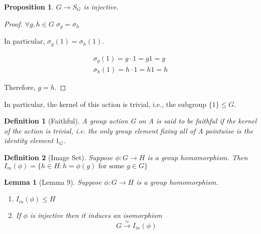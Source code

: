 \documentclass[11pt, oneside]{book}
\theoremstyle{break}
\newtheorem*{proof}{Proof}
\newtheorem{lemma}{Lemma}[section]
\newtheorem{propo}{Proposition}[section]
\newtheorem{defn}{Definition}[section]
\begin{document}
\begin{propo}
    \label{propo_8}
    $G \to S_G$ is injective.
\end{propo}

\begin{proof}
    $\forall g, h \in G \; \sigma_g = \sigma_h$

    In particular, $\sigma_g(1) = \sigma_h(1)$.

    \begin{gather*}
        \sigma_g(1) = g \cdot 1 = g1 = g \\
        \sigma_h(1) = h \cdot 1 = h1 = h
    \end{gather*}

    Therefore, $g = h$.
\end{proof}

In particular, the kernel of this action is trivial, i.e., the subgroup $\{1\} \leq G$.

\begin{defn}[Faithful]
    A group action G on A is said to be faithful if the kernel of the action is trivial, i.e. 
    the only group element fixing all of A pointwise is the identity element $1_G$.
\end{defn}

\begin{defn}[Image Set]
    Suppose $\phi : G \to H$ is a group homomorphism. Then 
    $I_m(\phi) = \{h \in H : h = \phi(g) \text{ for some } g \in G\}$
\end{defn}

\begin{lemma}[Lemma 9]
    \label{lemma:9}
    Suppose $\phi : G \to H$ is a group homomorphism.
    \begin{enumerate}
        \item $I_m(\phi) \leq H$
        \item If $\phi$ is injective then it induces an isomorphism
            \begin{equation}
                G \overset{\simeq}{\to} I_m(\phi)
            \end{equation}
    \end{enumerate}
\end{lemma}
\end{document}
